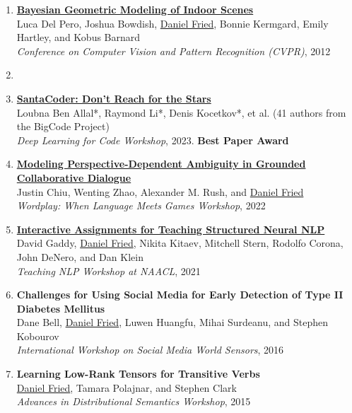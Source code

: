 \begin{enumerate}[leftmargin=-1mm,partopsep=0pt]
\item \href{https://people.eecs.berkeley.edu/~dfried/papers/Del-Pero-CVPR-12.pdf}{\textbf{Bayesian Geometric Modeling of Indoor Scenes}} \\
  Luca Del Pero, Joshua Bowdish, \underline{Daniel Fried}, Bonnie Kermgard, Emily Hartley, and Kobus Barnard\\
  \emph{Conference on Computer Vision and Pattern Recognition (CVPR)}, 2012

\item[]

\item \href{https://arxiv.org/abs/2301.03988}{\textbf{SantaCoder: Don't Reach for the Stars}} \\
  Loubna Ben Allal*, Raymond Li*, Denis Kocetkov*, et al. (41 authors from the BigCode Project)\\
  \emph{Deep Learning for Code Workshop}, 2023. \textbf{Best Paper Award}

\item \href{https://openreview.net/pdf?id=PkHSHZLig5H}{\textbf{Modeling Perspective-Dependent Ambiguity in Grounded Collaborative Dialogue}} \\
  Justin Chiu, Wenting Zhao, Alexander M. Rush, and \underline{Daniel Fried}\\
  \emph{Wordplay: When Language Meets Games Workshop}, 2022

\item \href{http://nlp.cs.berkeley.edu/pubs/Gaddy-Fried-Kitaev-Stern-Corona-DeNero-Klein_2021_TeachingNLP_paper.pdf}{\textbf{Interactive Assignments for Teaching Structured Neural NLP}} \\
  David Gaddy, \underline{Daniel Fried}, Nikita Kitaev, Mitchell Stern, Rodolfo Corona, John DeNero, and Dan Klein\\
  \emph{Teaching NLP Workshop at NAACL}, 2021

\item \textbf{Challenges for Using Social Media for Early Detection of Type II Diabetes Mellitus} \\
  Dane Bell, \underline{Daniel Fried}, Luwen Huangfu, Mihai Surdeanu, and Stephen Kobourov\\
  \emph{International Workshop on Social Media World Sensors}, 2016

\item \textbf{Learning Low-Rank Tensors for Transitive Verbs} \\
  \underline{Daniel Fried}, Tamara Polajnar, and Stephen Clark\\
  \emph{Advances in Distributional Semantics Workshop}, 2015


\end{enumerate}
